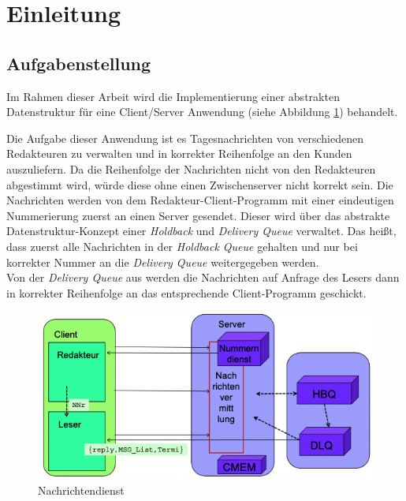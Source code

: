 \section{Einleitung}

\subsection{Aufgabenstellung}

Im Rahmen dieser Arbeit wird die Implementierung einer abstrakten Datenstruktur für eine Client/Server Anwendung (siehe Abbildung \ref{fig:nachrichtendienst}) behandelt. 

Die Aufgabe dieser Anwendung ist es Tagesnachrichten von verschiedenen Redakteuren zu verwalten und in korrekter Reihenfolge an den Kunden auszuliefern. Da die Reihenfolge der Nachrichten nicht von den Redakteuren abgestimmt wird, würde diese ohne einen Zwischenserver nicht korrekt sein. Die Nachrichten werden von dem Redakteur-Client-Programm mit einer eindeutigen Nummerierung zuerst an einen Server gesendet. Dieser wird über das abstrakte Datenstruktur-Konzept einer \textit{Holdback} und \textit{Delivery Queue} verwaltet. Das heißt, dass zuerst alle Nachrichten in der \textit{Holdback Queue} gehalten und nur bei korrekter Nummer an die \textit{Delivery Queue} weitergegeben werden.\\ 
Von der \textit{Delivery Queue} aus werden die Nachrichten auf Anfrage des Lesers dann in korrekter Reihenfolge an das entsprechende Client-Programm geschickt.\\

\begin{figure}[htbp]
\begin{center}
\includegraphics[scale=0.6]{Bilder/NachrichtendienstAbb.png}
\caption{\label{fig:nachrichtendienst} Nachrichtendienst \cite{Klauck2021}} 
\end{center}
\end{figure}

